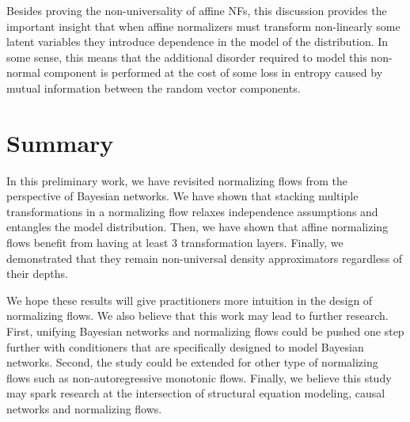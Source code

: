 Besides proving the non-universality of affine NFs, this discussion provides the important insight that when affine normalizers must transform non-linearly some latent variables they introduce dependence in the model of the distribution. In some sense, this means that the additional disorder required to model this non-normal component is performed at the cost of some loss in entropy caused by mutual information between the random vector components.
\section{Summary}

In this preliminary work, we have revisited normalizing flows from the perspective of Bayesian networks.
We have shown that stacking multiple transformations in a normalizing flow relaxes independence assumptions and entangles the model distribution.
Then, we have shown that affine normalizing flows benefit from having at least 3 transformation layers.
Finally, we demonstrated that they remain non-universal density approximators regardless of their depths.


We hope these results will give practitioners more intuition in the design of normalizing flows.
We also believe that this work may lead to further research.
First, unifying Bayesian networks and normalizing flows could be pushed one step further with conditioners that are specifically designed to model Bayesian networks.
Second, the study could be extended for other type of normalizing flows such as non-autoregressive monotonic flows.
Finally, we believe this study may spark research at the intersection of structural equation modeling, causal networks and normalizing flows.
